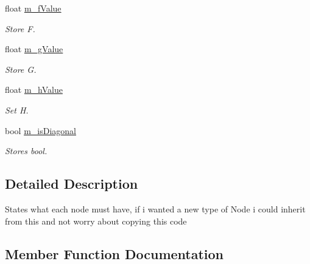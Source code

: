 \begin{DoxyCompactItemize}
\mbox{\label{class_node_interface_a93fbc84071fcaefe031ae65927701814}} 
float \mbox{\hyperlink{class_node_interface_a93fbc84071fcaefe031ae65927701814}{m\+\_\+f\+Value}}
\begin{DoxyCompactList}\small\item\em Store F. \end{DoxyCompactList}\item 
\mbox{\label{class_node_interface_af3c69e17a7eb84a082001443d7670d3c}} 
float \mbox{\hyperlink{class_node_interface_af3c69e17a7eb84a082001443d7670d3c}{m\+\_\+g\+Value}}
\begin{DoxyCompactList}\small\item\em Store G. \end{DoxyCompactList}\item 
\mbox{\label{class_node_interface_af6dd7f4959cfb1a8402a7202060eacc2}} 
float \mbox{\hyperlink{class_node_interface_af6dd7f4959cfb1a8402a7202060eacc2}{m\+\_\+h\+Value}}
\begin{DoxyCompactList}\small\item\em Set H. \end{DoxyCompactList}\item 
\mbox{\label{class_node_interface_aa0366b52d789726dfef6a806f1081dd9}} 
bool \mbox{\hyperlink{class_node_interface_aa0366b52d789726dfef6a806f1081dd9}{m\+\_\+is\+Diagonal}}
\begin{DoxyCompactList}\small\item\em Stores bool. \end{DoxyCompactList}\end{DoxyCompactItemize}


\subsection{Detailed Description}
States what each node must have, if i wanted a new type of Node i could inherit from this and not worry about copying this code 

\subsection{Member Function Documentation}
\mbox{\label{class_node_interface_a944dbfa74de55bdef1d583f318888aeb}} 
